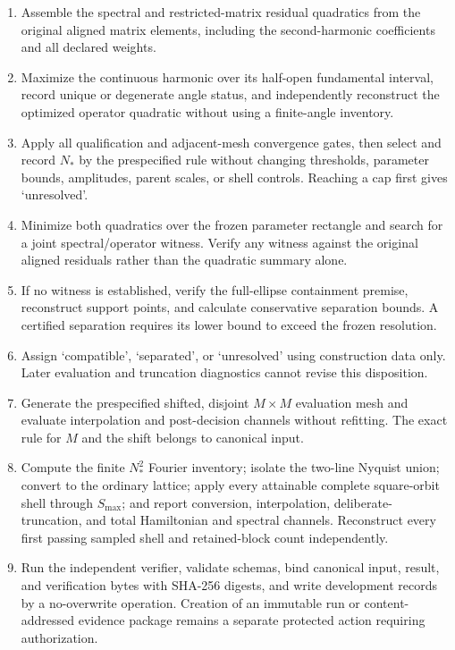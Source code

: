 \documentclass[11pt]{article}
\begin{document}
\begin{enumerate}[label=\arabic*.]
       $\mathcal U$ and $\mathcal G_W$, then form the separately named restricted
       Hamiltonian subtraction under $I_{N^2}\otimes R(\phi)$. Evaluate the flat
       $J_0(a)^2$ comparator directly and keep it separate from finite-mesh correlations.
 \item Assemble the spectral and restricted-matrix residual quadratics from the original
       aligned matrix elements, including the second-harmonic coefficients and all
       declared weights.
 \item Maximize the continuous harmonic over its half-open fundamental interval, record
       unique or degenerate angle status, and independently reconstruct the optimized
       operator quadratic without using a finite-angle inventory.
 \item Apply all qualification and adjacent-mesh convergence gates, then select and
       record $N_*$ by the prespecified rule without changing thresholds, parameter
       bounds, amplitudes, parent scales, or shell controls. Reaching a cap first gives
       `unresolved'.
 \item Minimize both quadratics over the frozen parameter rectangle and search for a
       joint spectral/operator witness. Verify any witness against the original aligned
       residuals rather than the quadratic summary alone.
 \item If no witness is established, verify the full-ellipse containment premise,
       reconstruct support points, and calculate conservative separation bounds. A
       certified separation requires its lower bound to exceed the frozen resolution.
 \item Assign `compatible', `separated', or `unresolved' using construction data only.
       Later evaluation and truncation diagnostics cannot revise this disposition.
 \item Generate the prespecified shifted, disjoint $M\times M$ evaluation mesh and
       evaluate interpolation and post-decision channels without refitting. The exact
       rule for $M$ and the shift belongs to canonical input.
 \item Compute the finite $N_*^2$ Fourier inventory; isolate the two-line Nyquist union;
       convert to the ordinary lattice; apply every attainable complete square-orbit
       shell through $S_{\max}$; and report conversion, interpolation, deliberate-
       truncation, and total Hamiltonian and spectral channels. Reconstruct every first
       passing sampled shell and retained-block count independently.
 \item Run the independent verifier, validate schemas, bind canonical input, result, and
       verification bytes with SHA-256 digests, and write development records by a
       no-overwrite operation. Creation of an immutable run or content-addressed
       evidence package remains a separate protected action requiring authorization.
\end{enumerate}
\end{document}
